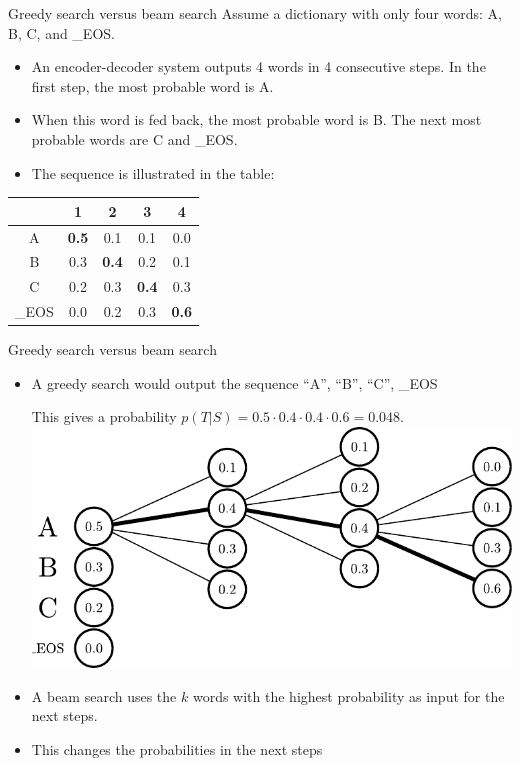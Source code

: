\documentclass{beamer}
\begin{document}
\begin{frame}{Greedy search versus beam search}
Assume a dictionary with only four words:  A, B, C, and \_EOS.
\begin{itemize}
    \item An encoder-decoder system outputs 4 words in 4 consecutive steps. In the first step, the most probable word is A.
    \item When this word is fed back, the most probable word is B. The next most probable words are C and \_EOS.
    \item The sequence is illustrated in the table:
\end{itemize}
\begin{table}[]
    \centering
    \begin{tabular}{c||c|c|c|c|}
       & 1 & 2 & 3 & 4  \\
     \hline
     \hline
      A   & \textbf{0.5} & 0.1 & 0.1 & 0.0  \\   
     \hline
     B    & 0.3 & \textbf{0.4} & 0.2 & 0.1 \\   
     \hline
     C    & 0.2 & 0.3 & \textbf{0.4} & 0.3 \\   
     \hline
     \_EOS    & 0.0 & 0.2 & 0.3 & \textbf{0.6} \\  
     \hline
    \end{tabular}
\end{table}
\end{frame}
\begin{frame}{Greedy search versus beam search}
    \begin{itemize}
   
        \item A greedy search would output the sequence ``A'', ``B'', ``C'', \_EOS 
\begin{center}
This gives a probability $p(T|S) = 0.5 \cdot 0.4 \cdot 0.4 \cdot 0.6 = 0.048$.
\includegraphics[scale=0.5]{Module 5 (RNN)/pics/greedy_search.pdf}
\end{center}
        \item A beam search uses  the $k$ words with the highest probability as input for the next steps.
        \item This changes the probabilities in the next steps
    \end{itemize}
\end{frame}
\end{document}
